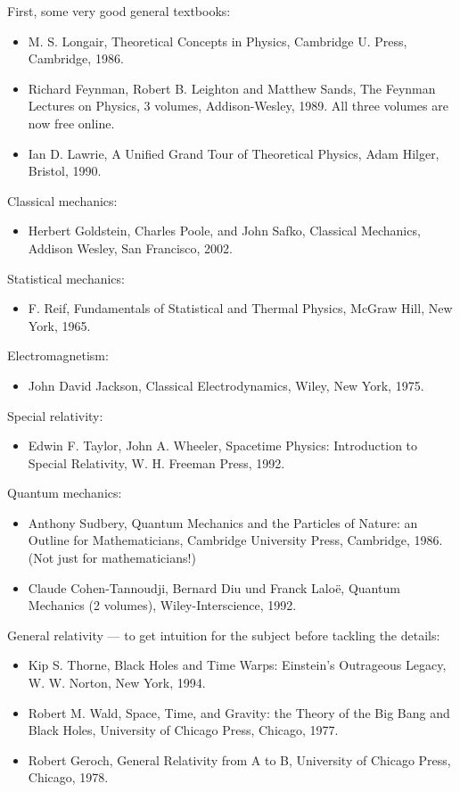 \documentclass[10pt,a4paper]{book}
\theoremstyle{definition}
\begin{document}
First, some very good general textbooks:
\begin{itemize}
\item M. S. Longair, Theoretical Concepts in Physics, Cambridge U. Press, Cambridge, 1986.

\item Richard Feynman, Robert B. Leighton and Matthew Sands, The Feynman Lectures on Physics, 3 volumes, Addison-Wesley, 1989. All three volumes are now free online.
\item Ian D. Lawrie, A Unified Grand Tour of Theoretical Physics, Adam Hilger, Bristol, 1990.
\end{itemize}

Classical mechanics:
\begin{itemize}
\item Herbert Goldstein, Charles Poole, and John Safko, Classical Mechanics, Addison Wesley, San Francisco, 2002.
\end{itemize}

Statistical mechanics:
\begin{itemize}
\item F. Reif, Fundamentals of Statistical and Thermal Physics, McGraw Hill, New York, 1965.
\end{itemize}

Electromagnetism:
\begin{itemize}
\item John David Jackson, Classical Electrodynamics, Wiley, New York, 1975.
\end{itemize}

Special relativity:
\begin{itemize}
\item Edwin F. Taylor, John A. Wheeler, Spacetime Physics: Introduction to Special Relativity, W. H. Freeman Press, 1992.
\end{itemize}

Quantum mechanics:
\begin{itemize}
\item Anthony Sudbery, Quantum Mechanics and the Particles of Nature: an Outline for Mathematicians, Cambridge University Press, Cambridge, 1986. (Not just for mathematicians!)

\item Claude Cohen-Tannoudji, Bernard Diu und Franck Laloë, Quantum Mechanics (2 volumes), Wiley-Interscience, 1992. 
\end{itemize}


General relativity — to get intuition for the subject before tackling the details:
\begin{itemize}
\item  Kip S. Thorne, Black Holes and Time Warps: Einstein's Outrageous Legacy, W. W. Norton, New York, 1994.
\item Robert M. Wald, Space, Time, and Gravity: the Theory of the Big Bang and Black Holes, University of Chicago Press, Chicago, 1977.
\item Robert Geroch, General Relativity from A to B, University of Chicago Press, Chicago, 1978.
\end{itemize}
\end{document}
